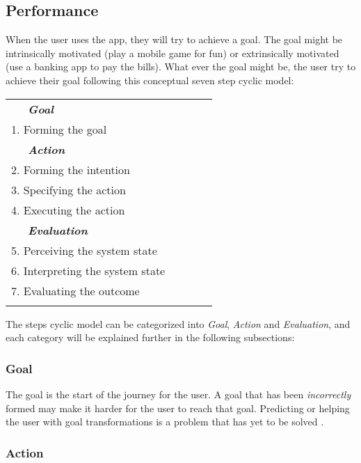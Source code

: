 \subsection{Performance}

When the user uses the app, they will try to achieve a goal. The goal might be intrinsically motivated (play a mobile game for fun) or extrinsically motivated (use a banking app to pay the bills). What ever the goal might be, the user try to achieve their goal following this conceptual seven step cyclic model:

\begin{minipage}{\linewidth}
\centering
{} \label{tab:title2}
  \begin{tabular}{ p{0.8\linewidth} } \toprule
    \ \ \ \emph{\textbf{Goal}}\\
    1. Forming the goal \\
    \ \ \ \emph{\textbf{Action}} \\
    2. Forming the intention \\
    3. Specifying the action \\
    4. Executing the action \\
    \ \ \ \emph{\textbf{Evaluation}} \\
    5. Perceiving the system state \\
    6. Interpreting the system state \\
    7. Evaluating the outcome \\
    \bottomrule
  \hline
  \label{table:questions}
  \end{tabular}
\end{minipage}

The steps cyclic model can be categorized into \textit{Goal}, \textit{Action} and \textit{Evaluation}, and each category will be explained further in the following subsections:

\subsubsection{Goal}

The goal is the start of the journey for the user. A goal that has been \textit{incorrectly} formed may make it harder for the user to reach that goal. Predicting or helping the user with goal transformations is a problem that has yet to be solved \cite{Polson1990}.

\subsubsection{Action}

